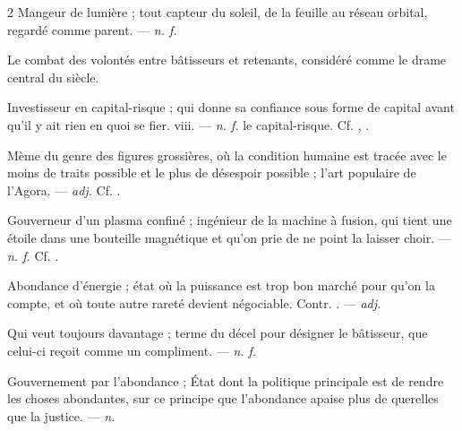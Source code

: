 \begin{multicols}{2}
 Mangeur de lumière ; tout capteur du soleil, de la feuille au réseau orbital, regardé comme parent.  —  \textit{n. f.}

 Le combat des volontés entre bâtisseurs et retenants, considéré comme le drame central du siècle.

 Investisseur en capital-risque ; qui donne sa confiance sous forme de capital avant qu'il y ait rien en quoi se fier.   viii. —  \textit{n. f.} le capital-risque. Cf. , .

 Mème du genre des figures grossières, où la condition humaine est tracée avec le moins de traits possible et le plus de désespoir possible ; l'art populaire de l'Agora. —  \textit{adj.} Cf. .

 Gouverneur d'un plasma confiné ; ingénieur de la machine à fusion, qui tient une étoile dans une bouteille magnétique et qu'on prie de ne point la laisser choir. —  \textit{n. f.} Cf. .

 Abondance d'énergie ; état où la puissance est trop bon marché pour qu'on la compte, et où toute autre rareté devient négociable. Contr. . —  \textit{adj.}

  Qui veut toujours davantage ; terme du décel pour désigner le bâtisseur, que celui-ci reçoit comme un compliment.   —  \textit{n. f.}

 Gouvernement par l'abondance ; État dont la politique principale est de rendre les choses abondantes, sur ce principe que l'abondance apaise plus de querelles que la justice. —  \textit{n.}


\end{multicols}
